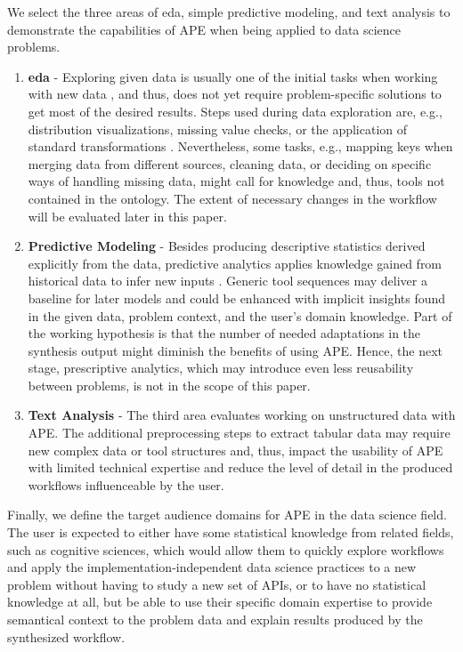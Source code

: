 We select the three areas of \ac{eda}, simple predictive modeling, and text analysis to demonstrate the capabilities of APE when being applied to data science problems.
\begin{enumerate}
    \item \textbf{\ac{eda}} - Exploring given data is usually one of the initial tasks when working with new data \cite{tukey1977exploratory}, and thus, does not yet require problem-specific solutions to get most of the desired results. Steps used during data exploration are, e.g., distribution visualizations, missing value checks, or the application of standard transformations \cite{bruce2020practical}. Nevertheless, some tasks, e.g., mapping keys when merging data from different sources, cleaning data, or deciding on specific ways of handling missing data, might call for knowledge and, thus, tools not contained in the ontology. The extent of necessary changes in the workflow will be evaluated later in this paper.
    \item \textbf{Predictive Modeling} - Besides producing descriptive statistics derived explicitly from the data, predictive analytics applies knowledge gained from historical data to infer new inputs \cite{cao2017data}. Generic tool sequences may deliver a baseline for later models and could be enhanced with implicit insights found in the given data, problem context, and the user’s domain knowledge. Part of the working hypothesis is that the number of needed adaptations in the synthesis output might diminish the benefits of using APE. Hence, the next stage, prescriptive analytics, which may introduce even less reusability between problems, is not in the scope of this paper.
    \item \textbf{Text Analysis} - The third area evaluates working on unstructured data with APE. The additional preprocessing steps to extract tabular data may require new complex data or tool structures and, thus, impact the usability of APE with limited technical expertise and reduce the level of detail in the produced workflows influenceable by the user.
\end{enumerate}
Finally, we define the target audience domains for APE in the data science field. The user is expected to either have some statistical knowledge from related fields, such as cognitive sciences, which would allow them to quickly explore workflows and apply the implementation-independent data science practices to a new problem without having to study a new set of APIs, or to have no statistical knowledge at all, but be able to use their specific domain expertise to provide semantical context to the problem data and explain results produced by the synthesized workflow.

